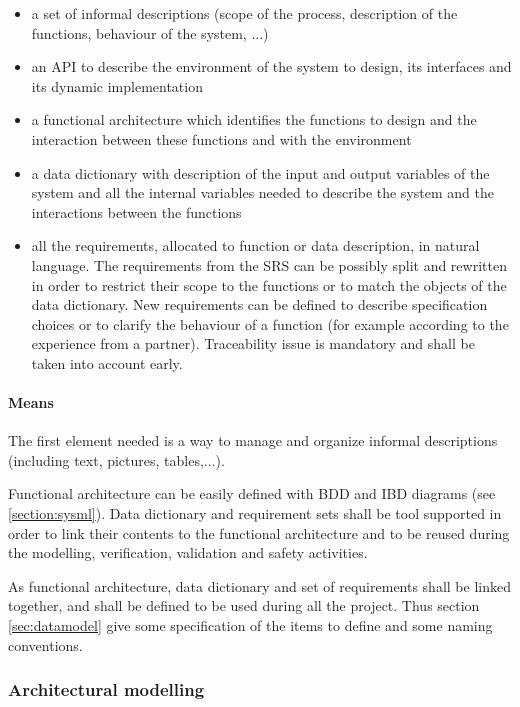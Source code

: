 \begin{itemize}
\item a set of informal descriptions (scope of the process, description of the functions, behaviour of the system, ...)
\item  an API to  describe the environment of the system to design, its interfaces and its dynamic implementation
\item a functional architecture which identifies the functions to design and the interaction between these functions and with the environment
\item a data dictionary with description of the input and output variables of the system and all the internal variables needed to  describe the system and the interactions between the functions
\item all the requirements, allocated to function or data description, in natural language. The requirements from the SRS can be possibly split and rewritten in order to restrict their scope to the functions or to match the objects of the data dictionary. New requirements can be defined to describe specification choices or to clarify the behaviour of a function (for example according to the experience from a partner). Traceability issue is mandatory and shall be taken into account early.

\end{itemize}

\paragraph{Means}

The first element needed is a way to manage and organize informal descriptions (including text, pictures, tables,...). 

Functional architecture can be easily defined with BDD and IBD diagrams (see \ref{section:sysml}).
Data dictionary  and requirement sets shall be tool supported in order to link their contents to the functional architecture and to  be reused during the modelling, verification, validation and safety activities.

As functional architecture, data dictionary and set of requirements shall be linked together, and shall be defined to be used during all the project. Thus section \ref{sec:datamodel} give some specification of the items to define and some naming conventions.

\subsubsection{Architectural modelling}


